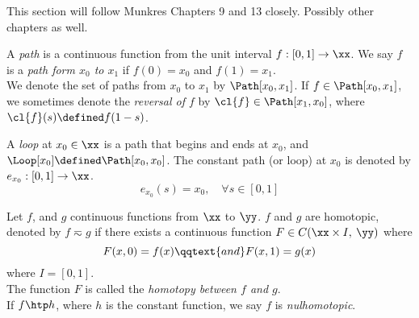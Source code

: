 \documentclass[../main-v2-manifolds.tex]{subfiles}
\begin{document}
\newpage


This section will follow Munkres Chapters 9 and 13 closely. Possibly other chapters as well.

\begin{definition}[Path]\label{munkres:path}
    A \emph{path} is a continuous function from the unit interval $f:[0,1]\to \xx$. We say $f$ is a \emph{path form $x_0$ to $x_1$} if $f(0)=x_0$ and $f(1)=x_1$.\\

    We denote the set of paths from $x_0$ to $x_1$ by $\Path[x_0, x_1]$. If $f\in\Path[x_0,x_1]$, we sometimes denote the \emph{reversal of $f$} by $\cl{f}\in\Path[x_1,x_0]$, where $\cl{f}(s)\defined f(1-s)$.
\end{definition}

\begin{definition}[Loop]\label{munkres:loop}
    A \emph{loop} at $x_0\in\xx$ is a path that begins and ends at $x_0$, and $\Loop[x_0]\defined\Path[x_0,x_0]$. The constant path (or loop) at $x_0$ is denoted by $e_{x_0}: [0,1]\to \xx$. 
    \[
        e_{x_0}(s)=x_0,\quad \forall s\in[0,1]
    \]
\end{definition}
\begin{definition}[Homotopy of $C(\xx,\:\yy)$]\label{munkres:homotopy-of-functions}
    Let $f$, and $g$ continuous functions from $\xx$ to $\yy$. $f$ and $g$ are homotopic, denoted by $f\eqsim g$ if there exists a continuous function $F\in C(\xx\times I,\: \yy)$ where
    \begin{equation}\label{munkres:homotopy-functions-equation}
        F(x,0)=f(x)\qqtext{and} F(x,1) = g(x)
    \end{equation}
    where $I = [0,1]$.\\

    The function $F$ is called the \emph{homotopy between $f$ and $g$}.\\

    If $f\htp h$, where $h$ is the constant function, we say $f$ is \emph{nulhomotopic}.
\end{definition}
\end{document}
